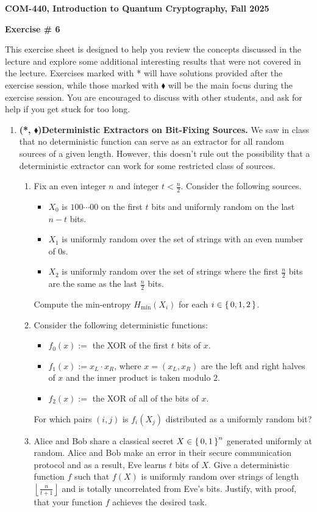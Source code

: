 \documentclass[12pt]{article}
\newcommand{\header}[1]{\begin{center} {\large\bf #1} \end{center}}
\begin{document}
\header{COM-440, Introduction to Quantum Cryptography, Fall 2025}
\header{\bf Exercise \# 6}

This exercise sheet is designed to help you review the concepts discussed in the lecture and explore some additional interesting results that were not covered in the lecture. Exercises marked with * will have solutions provided after the exercise session, while those marked with $\blacklozenge$ will be the main focus during the exercise session. You are encouraged to discuss with other students, and ask for help if you get stuck for too long.

\begin{enumerate}


\item \textbf{(*, $\blacklozenge$)Deterministic Extractors on Bit-Fixing Sources.}
We saw in class that no deterministic function can serve as an extractor for all random sources of a given length. However, this doesn't rule out the possibility that a deterministic extractor can work for some restricted class of sources.
\begin{enumerate}
	\item Fix an even integer $n$ and integer $t < \frac n2$. Consider the following sources.
	\begin{itemize}
		\item $X_0$ is $100\cdots00$ on the first $t$ bits and uniformly random on the last $n-t$ bits.
		\item $X_1$ is uniformly random over the set of strings with an even number of $0$s. 
		\item $X_2$ is uniformly random over the set of strings where the first $\frac n2$ bits are the same as the last $\frac n2$ bits. 
	\end{itemize}
	Compute the min-entropy $H_\text{min}(X_i)$ for each $i\in \set{0,1,2}$.

	\item  Consider the following deterministic functions:
	\begin{itemize}
		\item $f_0(x):=$ the XOR of the first $t$ bits of $x$.
		\item $f_1(x):= x_L\cdot x_R$, where $x=(x_L,x_R)$ are the left and right halves of $x$ {and the inner product is taken modulo $2$}. 
		\item $f_2(x):=$ the XOR of all of the bits of $x$.
	\end{itemize}
	For which pairs $(i,j)$ is $f_i(X_j)$ distributed as a uniformly random bit?
	\item Alice and Bob share a classical secret $X\in \set{0,1}^n$ generated uniformly at random. Alice and Bob make an error in their secure communication protocol and as a result, Eve learns $t$ bits of $X$. Give a deterministic function $f$ such that $f(X)$ is uniformly random over strings of length $\left\lfloor\frac n{t+1}\right\rfloor$ and is totally uncorrelated from Eve's bits. Justify, with proof, that your function $f$ achieves the desired task.
\end{enumerate}

\end{enumerate}
\end{document}
